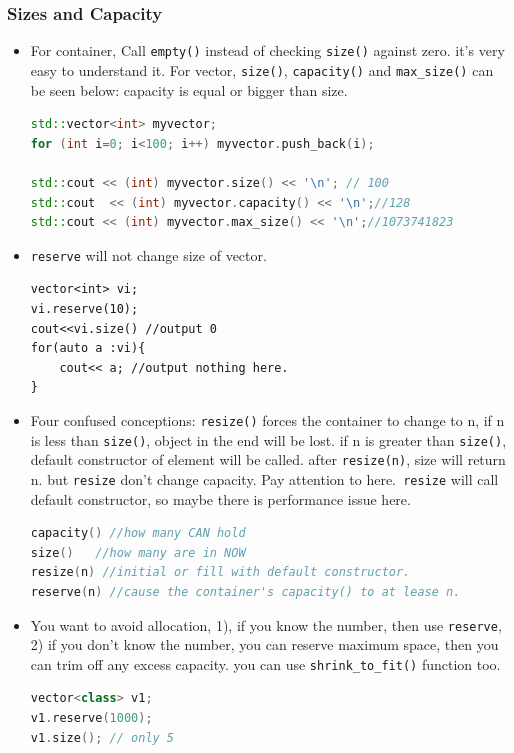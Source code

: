 \documentclass[a4paper,11pt,twoside]{book}
\begin{document}
\subsubsection{Sizes and Capacity}
\begin{itemize}
	\item For container, Call \texttt{empty()} instead of checking \texttt{size()} against zero. it's very easy to understand it. For vector, \texttt{size()}, \texttt{capacity()} and \texttt{max\_size()} can be seen below: capacity is equal or bigger than size. 
\begin{lstlisting}[frame=single, language=c++]
std::vector<int> myvector;
for (int i=0; i<100; i++) myvector.push_back(i);

std::cout << (int) myvector.size() << '\n'; // 100
std::cout  << (int) myvector.capacity() << '\n';//128
std::cout << (int) myvector.max_size() << '\n';//1073741823
\end{lstlisting}

	\item \texttt{reserve} will not change size of vector. 
\begin{lstlisting}
vector<int> vi;
vi.reserve(10);
cout<<vi.size() //output 0
for(auto a :vi){
	cout<< a; //output nothing here.
}
\end{lstlisting}
		
	
	
	\item Four confused conceptions: \texttt{resize()} forces the container to change to n, if n is less than \texttt{size()},  object in the end will be lost. if n is greater than \texttt{size()},  default constructor of element will be called. after \texttt{resize(n)}, size will return n. but \texttt{resize} don't change capacity. Pay attention to here.\texttt{ resize} will call default constructor, so maybe there is performance issue here.
\begin{lstlisting}[frame=single, language=c++]
capacity() //how many CAN hold
size()   //how many are in NOW
resize(n) //initial or fill with default constructor.
reserve(n) //cause the container's capacity() to at lease n.
\end{lstlisting}	
	
	\item You want to avoid allocation, 1), if you know the number, then use \texttt{reserve}, 2) if you don't know the number, you can reserve maximum space, then you can trim off any excess capacity.  you can use \texttt{shrink\_to\_fit()} function too. 
\begin{lstlisting}[frame=single, language=c++]
vector<class> v1;
v1.reserve(1000); 
v1.size(); // only 5


\end{lstlisting}
\end{itemize}
\end{document}
